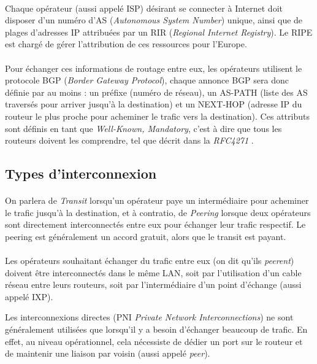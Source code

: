 \paragraph{}
Chaque opérateur (aussi appelé ISP) désirant se connecter à Internet doit disposer d'un numéro d'AS (\emph{Autonomous System Number}) unique, ainsi que de plages d'adresses IP attribuées par un RIR (\emph{Regional Internet Registry}). Le RIPE est chargé de gérer l'attribution de ces ressources pour l'Europe.

\paragraph{}
Pour échanger ces informations de routage entre eux, les opérateurs utilisent le protocole BGP (\emph{Border Gateway Protocol}), chaque annonce BGP sera donc définie par au moins : un préfixe (numéro de réseau), un AS-PATH (liste des AS traversés pour arriver jusqu'à la destination) et un NEXT-HOP (adresse IP du routeur le plus proche pour acheminer le trafic vers la destination). Ces attributs sont définis en tant que \emph{Well-Known, Mandatory}, c'est à dire que tous les routeurs doivent les comprendre, tel que décrit dans la \emph{RFC4271} \cite{fenioux:BGP4}.

\subsection{Types d'interconnexion}

\paragraph{}
On parlera de \emph{Transit} lorsqu'un opérateur paye un intermédiaire pour acheminer le trafic jusqu'à la destination,
et à contratio, de \emph{Peering} lorsque deux opérateurs sont directement interconnectés entre eux pour échanger leur trafic respectif. Le peering est généralement un accord gratuit, alors que le transit est payant.

\paragraph{}
Les opérateurs souhaitant échanger du trafic entre eux (on dit qu'ils \emph{peerent}) doivent être interconnectés dans le même LAN, soit par l'utilisation d'un cable réseau entre leurs routeurs, soit par l'intermédiaire d'un point d'échange (aussi appelé IXP).

Les interconnexions directes (PNI \emph{Private Network Interconnections}) ne sont généralement utilisées que lorsqu'il y a besoin d'échanger beaucoup de trafic. En effet, au niveau opérationnel, cela nécessiste de dédier un port sur le routeur et de maintenir une liaison par voisin (aussi appelé \emph{peer}).

